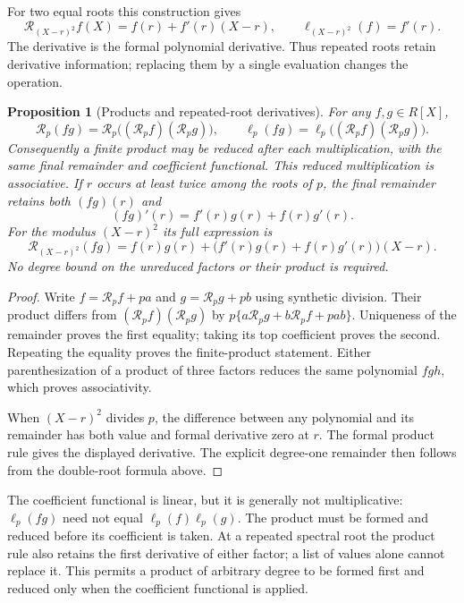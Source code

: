 \documentclass[11pt]{article}
\numberwithin{equation}{section}
\newtheorem{proposition}[theorem]{Proposition}
\theoremstyle{definition}\newtheorem{definition}[theorem]{Definition}
\theoremstyle{remark}\newtheorem{remark}[theorem]{Remark}
\begin{document}
For two equal roots this construction gives
\[
 \mathcal R_{(X-r)^2}f(X)=f(r)+f'(r)(X-r),
 \qquad \ell_{(X-r)^2}(f)=f'(r).
\]
The derivative is the formal polynomial derivative. Thus repeated
roots retain derivative information; replacing them by a single
evaluation changes the operation.

\begin{proposition}[Products and repeated-root derivatives]
\label{prop:canonical-remainder-products}
For any $f,g\in R[X]$,
\[
 \mathcal R_p(fg)=
 \mathcal R_p\bigl((\mathcal R_p f)(\mathcal R_p g)\bigr),
 \qquad
 \ell_p(fg)=\ell_p\bigl((\mathcal R_p f)(\mathcal R_p g)\bigr).
\]
Consequently a finite product may be reduced after each multiplication,
with the same final remainder and coefficient functional. This reduced
multiplication is associative. If $r$ occurs at least twice among the
roots of $p$, the final remainder retains both $(fg)(r)$ and
\[
 (fg)'(r)=f'(r)g(r)+f(r)g'(r).
\]
For the modulus $(X-r)^2$ its full expression is
\[
 \mathcal R_{(X-r)^2}(fg)
 =f(r)g(r)+\bigl(f'(r)g(r)+f(r)g'(r)\bigr)(X-r).
\]
No degree bound on the unreduced factors or their product is required.
\end{proposition}

\begin{proof}
Write $f=\mathcal R_p f+pa$ and $g=\mathcal R_p g+pb$ using
synthetic division. Their product differs from
$(\mathcal R_p f)(\mathcal R_p g)$ by
$p\{a\mathcal R_p g+b\mathcal R_p f+pab\}$. Uniqueness of the
remainder proves the first equality; taking its top coefficient proves
the second. Repeating the equality proves the finite-product statement.
Either parenthesization of a product of three factors reduces the same
polynomial $fgh$, which proves associativity.

When $(X-r)^2$ divides $p$, the difference between any polynomial and its
remainder has both value and formal derivative zero at $r$. The formal
product rule gives the displayed derivative. The explicit degree-one
remainder then follows from the double-root formula above.
\end{proof}

The coefficient functional is linear, but it is generally not
multiplicative: $\ell_p(fg)$ need not equal $\ell_p(f)\ell_p(g)$.
The product must be formed and reduced before its coefficient is taken.
At a repeated spectral root the product rule also retains the first
derivative of either factor; a list of values alone cannot replace it.
This permits a product of arbitrary degree to be formed first and
reduced only when the coefficient functional is applied.
\end{document}
